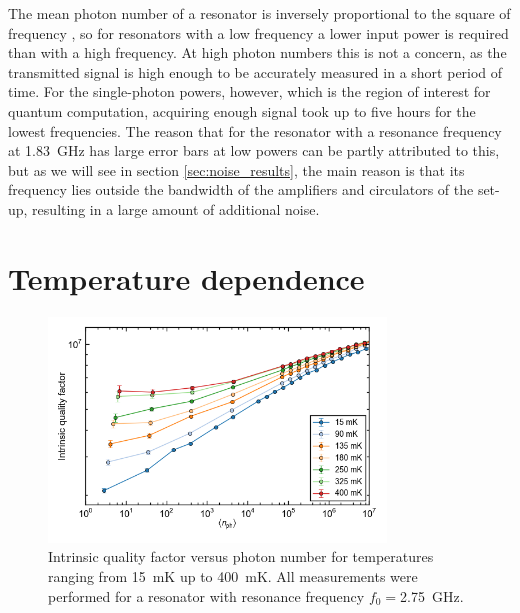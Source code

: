 The mean photon number of a resonator is inversely proportional to the square of frequency \cite{DRIE}, so for resonators with a low frequency a lower input power is required than with a high frequency. At high photon numbers this is not a concern, as the transmitted signal is high enough to be accurately measured in a short period of time. For the single-photon powers, however, which is the region of interest for quantum computation, acquiring enough signal took up to five hours for the lowest frequencies. The reason that for the resonator with a resonance frequency at \SI{1.83}{\giga \hertz} has large error bars at low powers can be partly attributed to this, but as we will see in section \ref{sec:noise_results}, the main reason is that its frequency lies outside the bandwidth of the amplifiers and circulators of the set-up, resulting in a large amount of additional noise.





\section{Temperature dependence}
\label{sec:resonator:results:emperature_dependence}
\begin{figure}
    \centering
    \includegraphics[width=0.8\textwidth]{Figures/DRIE/Qi_vs_n_photon_temperature_dependence.png}
    \caption{Intrinsic quality factor versus photon number for temperatures ranging from \SI{15}{\milli \kelvin} up to \SI{400}{\milli \kelvin}. All measurements were performed for a resonator with resonance frequency $f_0 = $\SI{2.75}{\giga \hertz}.}
    \label{fig:Qi_vs_n_photon_temperature_dependence}
\end{figure}

